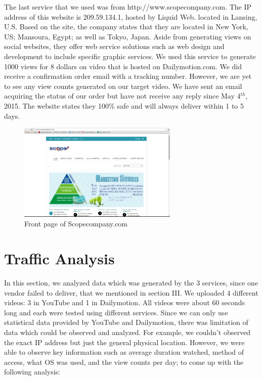 \documentclass[conference]{IEEEtran}
\begin{document}
The last service that we used was from http://www.scopecompany.com. The IP address of this website is 209.59.134.1, hosted by Liquid Web. located in Lansing, U.S. Based on the site, the company states that they are located in New York, US; Mansoura, Egypt; as well as Tokyo, Japan. Aside from generating views on social websites, they offer web service solutions such as web design and development to include specific graphic services.
We used this service to generate 1000 views for 8 dollars on video that is hosted on Dailymotion.com. We did receive a confirmation order email with a tracking number. However, we are yet to see any view counts generated on our target video. We have sent an email acquiring the status of our order but have not receive any reply since May 4$^{th}$, 2015. The website states they 100\% safe and will always deliver within 1 to 5 days.

\begin{figure}
  \centering
  \includegraphics[width=3.0in]{fig4}
  \caption{Front page of Scopecompany.com}
\end{figure}

\section{Traffic Analysis}

In this section, we analyzed data which was generated by the 3 services, since one vendor failed to deliver, that we mentioned in section III. We uploaded 4 different videos: 3 in YouTube and 1 in Dailymotion. All videos were about 60 seconds long and each were tested using different services. Since we can only use statistical data provided by YouTube and Dailymotion, there was limitation of data which could be observed and analyzed. For example, we couldn't observed the exact IP address but just the general physical location. However, we were able to observe key information such as average duration watched, method of access, what OS was used, and the view counts per day; to come up with the following analysis:
\end{document}
